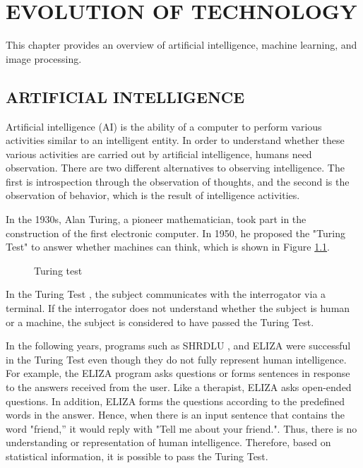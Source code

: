 \chapter{EVOLUTION OF TECHNOLOGY}\label{chp:Evaluation of Technology}

This chapter provides an overview of artificial intelligence, machine learning, and image processing. 

\section{ARTIFICIAL INTELLIGENCE}

Artificial intelligence (AI) is the ability of a computer to perform various activities similar to an intelligent entity. In order to understand whether these various activities are carried out by artificial intelligence, humans need observation. There are two different alternatives to observing intelligence. The first is introspection through the observation of thoughts, and the second is the observation of behavior, which is the result of intelligence activities.

In the 1930s, Alan Turing, a pioneer mathematician, took part in the construction of the first electronic computer. In 1950, he proposed the "Turing Test" to answer whether machines can think, which is shown in Figure \ref{fig:TuringTest}.

\begin{figure}[htbp]
\centering
{}
\caption{Turing test \cite{russel2010}}
\label{fig:TuringTest}
\end{figure}

In the Turing Test \cite{turing2009computing}, the subject communicates with the interrogator via a terminal. If the interrogator does not understand whether the subject is human or a machine, the subject is considered to have passed the Turing Test.

In the following years, programs such as SHRDLU \cite{winograd1972understanding}, and ELIZA \cite{mauldin1994chatterbots} were successful in the Turing Test even though they do not fully represent human intelligence. For example, the ELIZA program asks questions or forms sentences in response to the answers received from the user. Like a therapist, ELIZA asks open-ended questions. In addition, ELIZA forms the questions according to the predefined words in the answer. Hence, when there is an input sentence that contains the word "friend,'' it would reply with "Tell me about your friend.". Thus, there is no understanding or representation of human intelligence. Therefore, based on statistical information, it is possible to pass the Turing Test.

